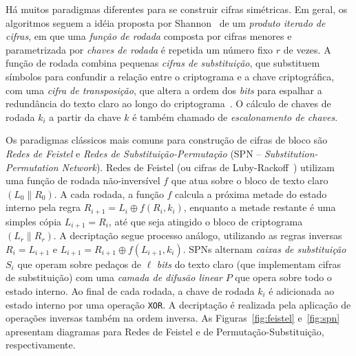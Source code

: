 Há muitos paradigmas diferentes para se construir cifras simétricas. Em geral, os algoritmos seguem a idéia proposta por Shannon~\cite{Shannon49} de um \emph{produto iterado de cifras}, em que uma \emph{função de rodada} composta por cifras menores e parametrizada por \emph{chaves de rodada} é repetida um número fixo $r$ de vezes. A função de rodada combina pequenas \emph{cifras de substituição}, que substituem símbolos para confundir a relação entre o criptograma e a chave criptográfica, com uma \emph{cifra de transposição}, que altera a ordem dos \emph{bits} para espalhar a redundância do texto claro ao longo do criptograma~\cite{Shannon49}. O cálculo de chaves de rodada $k_i$ a partir da chave $k$ é também chamado de \emph{escalonamento de chaves}.

Os paradigmas clássicos mais comuns para construção de cifras de bloco são \emph{Redes de Feistel} e \emph{Redes de Substituição-Permutação} (SPN -- \emph{Substitution-Permutation Network}). Redes de Feistel (ou cifras de Luby-Rackoff~\cite{LubyR88}) utilizam uma função de rodada não-inversível $f$ que atua sobre o bloco de texto claro $(L_0 \parallel R_0)$. A cada rodada, a função $f$ calcula a próxima metade do estado interno pela regra $R_{i+1} = L_i \oplus f(R_i, k_i)$, enquanto a metade restante é uma simples cópia $L_{i+1} = R_i$, até que seja atingido o bloco de criptograma $(L_r \parallel R_r)$. A decriptação segue processo análogo, utilizando as regras inversas $R_{i} = L_{i+1}$ e $L_{i+1} = R_{i+1} \oplus f(L_{i+1}, k_i)$. SPNs alternam \emph{caixas de substituição} $S_i$ que operam sobre pedaços de $\ell$ \emph{bits} do texto claro (que implementam cifras de substituição) com uma \emph{camada de difusão linear} $P$ que opera sobre todo o estado interno. Ao final de cada rodada, a chave de rodada $k_i$ é adicionada ao estado interno por uma operação \texttt{XOR}. A decriptação é realizada pela aplicação de operações inversas também na ordem inversa. As Figuras~\ref{fig:feistel} e~\ref{fig:spn} apresentam diagramas para Redes de Feistel e de Permutação-Substituição, respectivamente.

